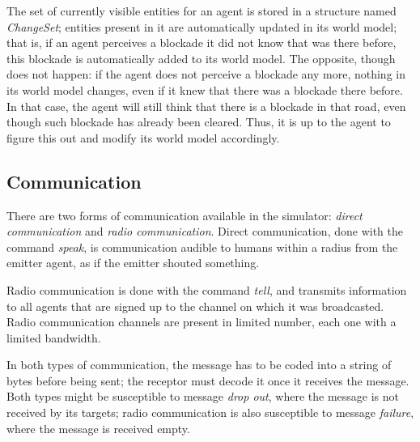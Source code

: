 \documentclass{article}
\begin{document}
The set of currently visible entities for an agent is stored in a structure named \emph{ChangeSet}; entities present in it are automatically updated in its world model; that is, if an agent perceives a blockade it did not know that was there before, this blockade is automatically added to its world model. The opposite, though does not happen: if the agent does not perceive a blockade any more, nothing in its world model changes, even if it knew that there was a blockade there before. In that case, the agent will still think that there is a blockade in that road, even though such blockade has already been cleared. Thus, it is up to the agent to figure this out and modify its world model accordingly.
\subsection{Communication}
There are two forms of communication available in the simulator: \emph{direct communication} and \emph{radio communication}. Direct communication, done with the command \emph{speak}, is communication audible to humans within a radius from the emitter agent, as if the emitter shouted something.

Radio communication is done with the command \emph{tell}, and transmits information to all agents that are signed up to the channel on which it was broadcasted. Radio communication channels are present in limited number, each one with a limited bandwidth.

In both types of communication, the message has to be coded into a string of bytes before being sent; the receptor must decode it once it receives the message. Both types might be susceptible to message \emph{drop out}, where the message is not received by its targets; radio communication is also susceptible to message \emph{failure}, where the message is received empty.


\end{document}
